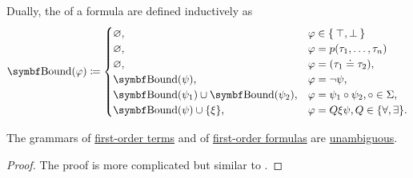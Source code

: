 \begin{definition}
\begin{DefEnum}
     Dually, the  of a formula are defined inductively as
    \begin{equation}\label{eq:def:first_order_language/formula_bound_variables}
      \Cat{Bound}(\varphi) \coloneqq \begin{cases}
        \varnothing,                                   &\varphi \in \Set{ \top, \bot } \\
        \varnothing,                                   &\varphi = p(\tau_1, \ldots, \tau_n) \\
        \varnothing,                                   &\varphi = (\tau_1 \doteq \tau_2), \\
        \Cat{Bound}(\psi),                             &\varphi = \neg \psi, \\
        \Cat{Bound}(\psi_1) \cup \Bold{Bound}(\psi_2), &\varphi = \psi_1 \circ \psi_2, \circ \in \Sigma, \\
        \Cat{Bound}(\psi) \cup \{ \xi \},              &\varphi = Q \xi \psi, Q \in \{ \forall, \exists \}.
      \end{cases}
    \end{equation}
  \end{DefEnum}
\end{definition}

\begin{proposition}\label{thm:first_order_terms_and_formulas_are_unambiguous}
  The grammars of \hyperref[def:first_order_language/term]{first-order terms} and of \hyperref[def:first_order_language/formula]{first-order formulas} are \hyperref[def:grammar_derivation/ambiguity]{unambiguous}.
\end{proposition}
\begin{proof}
  The proof is more complicated but similar to .
\end{proof}

